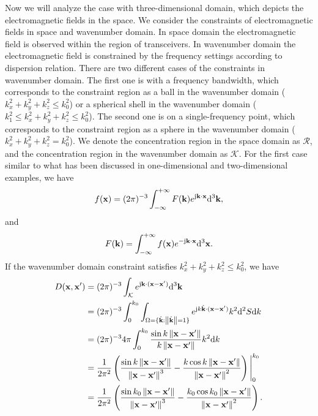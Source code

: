 \documentclass[12pt,draftclsnofoot,journal,onecolumn]{IEEEtran}
\begin{document}
	Now we will analyze the case with three-dimensional domain, which depicts the electromagnetic fields in the space. We consider the constraints of electromagnetic fields in space and wavenumber domain. In space domain the electromagnetic field is observed within the region of transceivers. In wavenumber domain the electromagnetic field is constrained by the frequency settings according to dispersion relation. There are two different cases of the constraints in wavenumber domain. The first one is with a frequency bandwidth, which corresponds to the constraint region as a ball in the wavenumber domain ($k_x^2+k_y^2+k_z^2 \leqslant k_0^2$) or a spherical shell in the wavenumber domain ($k_1^2 \leqslant k_x^2+k_y^2+k_z^2 \leqslant k_0^2$). The second one is on a single-frequency point, which corresponds to the constraint region as a sphere in the wavenumber domain ($k_x^2+k_y^2+k_z^2=k_0^2$). {\color{red} We denote the concentration region in the space domain as $\mathcal{R}$, and the concentration region in the wavenumber domain as $\mathcal{K}$.} For the first case similar to what has been discussed in one-dimensional and two-dimensional examples, we have 
	\begin{equation}
		\begin{aligned}
			f({\bf x})=(2\pi)^{-3}\int_{-\infty}^{+\infty}F({\bf k})e^{{\rm j}{\bf k}\cdot {\bf x}}{\rm d}^3{\bf k},
		\end{aligned}
	\end{equation}
	and
	\begin{equation}
		\begin{aligned}
			F({\bf k}) = \int_{-\infty}^{+\infty}f({\bf x})e^{-{\rm j}{\bf k}\cdot {\bf x}}{\rm d}^3{\bf x}.
		\end{aligned}
	\end{equation}
	If the wavenumber domain constraint satisfies $k_x^2+k_y^2+k_z^2 \leqslant k_0^2$, we have 
	\begin{equation}
		\begin{aligned}
			D({\bf x},{\bf x}') &= (2\pi)^{-3}\int_{\mathcal{K}} e^{{\rm j}{\bf k}\cdot({\bf x}-{\bf x}')}{\rm d}^3{\bf k} \\&= (2\pi)^{-3} \int_{0}^{k_0} \int_{{\Omega}=\{\hat{\bf k}: \left\| \hat{\bf k} \right\|=1\}} e^{{\rm j}k\hat{\bf k}\cdot({\bf x}-{\bf x}')}k^2{\rm d}^2S{\rm d}k
			\\& = (2\pi)^{-3} 4\pi \int_0^{k_0} \frac{\sin k \left\| {\bf x}-{\bf x}' \right\|}{k \left\| {\bf x}-{\bf x}' \right\|}k^2 {\rm d}k
			\\& = \frac{1}{2\pi^2} \left( \frac{\sin k\left\| {\bf x}-{\bf x}' \right\|}{\left\| {\bf x}-{\bf x}' \right\|^3}-\frac{k\cos k\left\| {\bf x}-{\bf x}' \right\|}{\left\| {\bf x}-{\bf x}' \right\|^2} \right) \Bigg|_0^{k_0}
			\\& = \frac{1}{2\pi^2} \left( \frac{\sin k_0\left\| {\bf x}-{\bf x}' \right\|}{\left\| {\bf x}-{\bf x}' \right\|^3}-\frac{k_0\cos k_0\left\| {\bf x}-{\bf x}' \right\|}{\left\| {\bf x}-{\bf x}' \right\|^2} \right).
		\end{aligned}
		\label{equ_ball}
	\end{equation}
\end{document}

